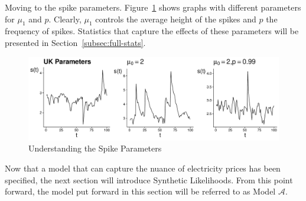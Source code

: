 Moving to the spike parameters. Figure~\ref{fig:spike_param} shows graphs with different parameters for $\mu_1$ and $p$. Clearly, $\mu_1$ controls the average height of the spikes and $p$ the frequency of spikes. Statistics that capture the effects of these parameters will be presented in Section~\ref{subsec:full-stats}.


\begin{figure}[H]
    \centering
    \includegraphics[width=12cm]{images/model/spike_example.pdf}
    \caption{Understanding the Spike Parameters}
    \label{fig:spike_param}
\end{figure}

Now that a model that can capture the nuance of electricity prices has been specified, the next section will introduce Synthetic Likelihoods. From this point forward, the model put forward in this section will be referred to as Model $\mathcal{A}$.